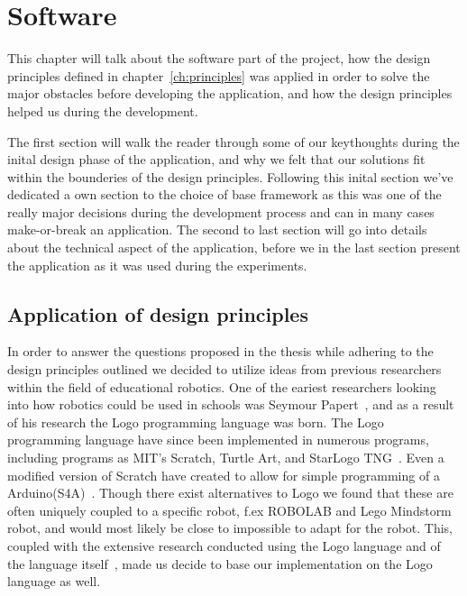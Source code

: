 \chapter{Software}\label{ch:software}
This chapter will talk about the software part of the project, how the design principles defined in chapter~\ref{ch:principles} was applied in order to solve the major obstacles before developing the application, and how the design principles helped us during the development. 

\bigskip\noindent
The first section will walk the reader through some of our keythoughts during the inital design phase of the application, and why we felt that our solutions fit within the bounderies of the design principles. 
Following this inital section we've dedicated a own section to the choice of base framework as this was one of the really major decisions during the development process and can in many cases make-or-break an application.
The second to last section will go into details about the technical aspect of the application, before we in the last section present the application as it was used during the experiments.

\section{Application of design principles}
In order to answer the questions proposed in the thesis while adhering to the design principles outlined we decided to utilize ideas from previous researchers within the field of educational robotics. 
One of the eariest researchers looking into how robotics could be used in schools was Seymour Papert~\cite{papert1980mindstorms}, and as a result of his research the Logo programming language was born. 
The Logo programming language have since been implemented in numerous programs, including programs as MIT's Scratch, Turtle Art, and StarLogo TNG~\cite{logoHomepage}. Even a modified version of Scratch have created to allow for simple programming of a Arduino(S4A)~\cite{logoForArduino}. Though there exist alternatives to Logo we found that these are often uniquely coupled to a specific robot, f.ex ROBOLAB and Lego Mindstorm robot, and would most likely be close to impossible to adapt for the \chirp robot. 
This, coupled with the extensive research conducted using the Logo language and of the language itself~\cite{clements1990effects,clements1993research,clements1996development,clements2001logo,papert1980mindstorms}, made us decide to base our implementation on the Logo language as well. 

